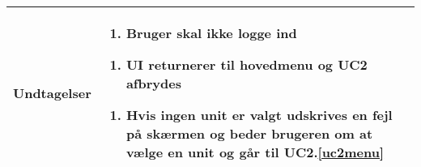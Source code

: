 \begin{table}[H]
\begin{tabular} {|p{6cm}|p{8cm}|}
		\textbf{Undtagelser}	
		
		&\begin{enumerate}[label= \ref{uc2login}a.]
			\item Bruger skal ikke logge ind
		\end{enumerate}
						
		\begin{enumerate}[label= \ref{uc2act}a.]
			\item UI returnerer til hovedmenu og UC2 afbrydes
		\end{enumerate}						
							
		\begin{enumerate}[label= \ref{uc2sysact}a.]
			\item Hvis ingen unit er valgt udskrives en fejl på skærmen og beder brugeren om at vælge en unit og går til UC2.\ref{uc2menu}
		\end{enumerate} \\\hline
											

	\end{tabular}
	\label{UC2} 
\end{table}